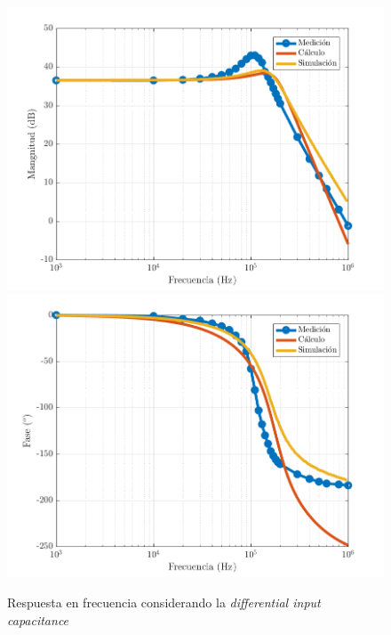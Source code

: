 \documentclass[../../main.tex]{subfiles}
\begin{document}
\begin{figure} [H]
	\centering
	\includegraphics[scale=0.75]{fotos/tc_tp2_ej2_bode_mag.png}
	\includegraphics[scale=0.75]{fotos/tc_tp2_ej2_bode_fase.png}
	\caption{Respuesta en frecuencia considerando la \textit{differential input capacitance}}
	\label{fig:hf-con-c}
\end{figure}
\end{document}
